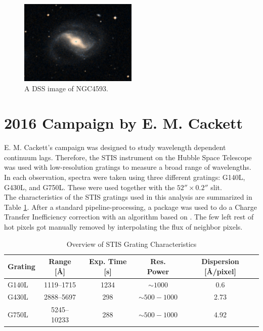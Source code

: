\begin{figure}[!ht]
	\centering
	\includegraphics[width=0.5\textwidth]{pictures/Chapter3/NGC4593.PNG}
	\caption{A DSS image of NGC4593.}
	\label{fig:NGC4593}
\end{figure}

\section{2016 Campaign by E. M. Cackett}
\label{Campaign_Cackett}

E. M. Cackett's campaign was designed to study wavelength dependent continuum lags. Therefore, the STIS instrument on the Hubble Space Telescope was used with low-resolution gratings to measure a broad range of wavelengths. In each observation, spectra were taken using three different gratings: G140L, G430L, and G750L. These were used together with the $52'' \times 0.2''$ slit.\\
The characteristics of the STIS gratings used in this analysis are summarized in Table \ref{tab:stis_gratings}. After a standard pipeline-processing, a package was used to do a Charge Transfer Inefficiency correction with an algorithm based on \parencite{anderson2010empirical}. The few left rest of hot pixels got manually removed by interpolating the flux of neighbor pixels.\\


\begin{table}[h!]
	\centering
	\small
	\caption{Overview of STIS Grating Characteristics \parencite{stisgratings}}
	\label{tab:stis_gratings}
	\begin{tabular}{lcccc}
		\hline
		\textbf{Grating} & \textbf{Range [\AA]} & \textbf{Exp. Time [s]} & \textbf{Res. Power} & \textbf{Dispersion [\AA/pixel]} \\
		\hline
		G140L  & 1119--1715  & 1234 & $\sim 1000$         & 0.6 \\
		G430L  & 2888--5697  & 298  & $\sim 500 - 1000$    & 2.73 \\
		G750L  & 5245--10233 & 288  & $\sim 500 - 1000$    & 4.92 \\
		\hline
	\end{tabular}
\end{table}

